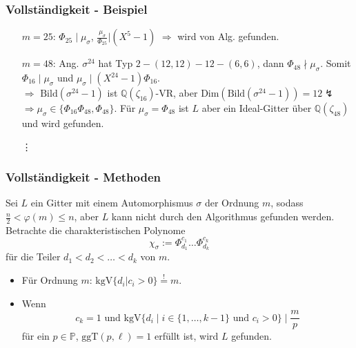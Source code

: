\documentclass{beamer}
\newcommand{\Q}{\mathbb{Q}}
\renewcommand{\P}{\mathbb{P}}
\newcommand{\Bild}{\text{Bild}}
\newcommand{\ggT}{\text{ggT}}
\newcommand{\kgV}{\text{kgV}}
\newcommand{\Dim}{\text{Dim}}
\begin{document}
\begin{frame}[plain]
	\frametitle{Vollständigkeit - Beispiel}
	\begin{itemize}
		\item[$m = 25$:] $\Phi_{25} \mid \mu_\sigma$, $\frac{\mu_\sigma}{\Phi_{25}} \vert (X^5-1)$ $\Rightarrow$ wird von Alg. gefunden.
		\pause
		\item[$m = 48$:] Ang. $\sigma^{24}$ hat Typ $2 - (12, 12) - 12 - (6, 6)$, dann $\Phi_{48} \nmid \mu_\sigma$. Somit $\Phi_{16} \mid \mu_\sigma$ und $\mu_\sigma \mid (X^{24}-1) \Phi_{16}$.\\
		$\Rightarrow$ $\Bild(\sigma^{24}-1)$ ist $\Q(\zeta_{16})$-VR, aber $\Dim(\Bild(\sigma^{24}-1)) = 12 \lightning$\\
		$\Rightarrow \mu_\sigma \in \lbrace \Phi_{16} \Phi_{48}, \Phi_{48} \rbrace$. Für $\mu_\sigma = \Phi_{48}$ ist $L$ aber ein Ideal-Gitter über $\Q(\zeta_{48})$ und wird gefunden.\\
		\pause
		\begin{center} \vdots \end{center}
	\end{itemize}
\end{frame}

\begin{frame}[plain]
	\frametitle{Vollständigkeit - Methoden}
	Sei $L$ ein Gitter mit einem Automorphismus $\sigma$ der Ordnung $m$, sodass $\frac{n}{2} < \varphi(m) \leq n$, aber $L$ kann nicht durch den Algorithmus gefunden werden.\\
	\pause
	Betrachte die charakteristischen Polynome
	\[\chi_\sigma := \Phi_{d_1}^{c_1} \dots \Phi_{d_k}^{c_k} \]
	für die Teiler $d_1 < d_2 < \dots < d_k$ von $m$.\\
	\pause
	\begin{itemize}
		\item Für Ordnung $m$: $\kgV\lbrace d_i \vert c_i > 0 \rbrace \stackrel{!}{=} m$.\\
		\pause
		\item Wenn
	 		\[c_k = 1 \text{ und } \kgV \lbrace d_i \mid i \in \lbrace 1, \dots, k-1 \rbrace \text{ und } c_i > 0 \rbrace \mid \frac{m}{p}\]
			für ein $p \in \P$, $\ggT(p, \ell) = 1$ erfüllt ist, wird $L$ gefunden.
	\end{itemize}
\end{frame}
\end{document}
